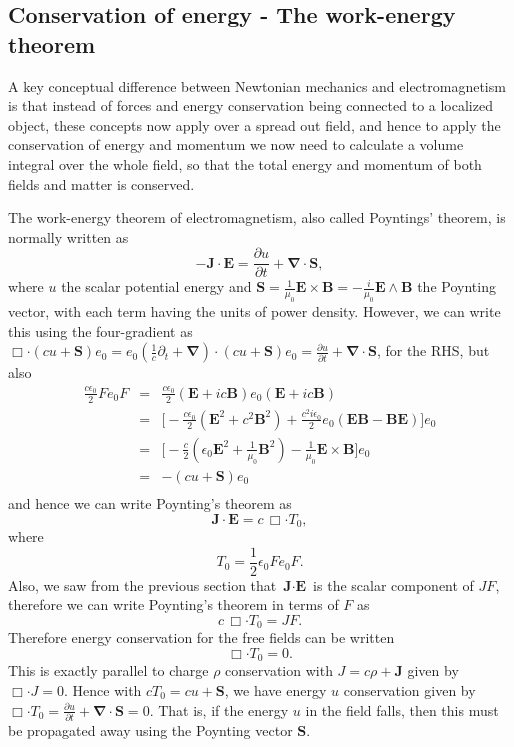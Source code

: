 \documentclass[12pt,aps,prb,preprint]{revtex4}   %
\newcommand{\be}{\begin{equation}}
\newcommand{\ee}{\end{equation}}
\newcommand{\bea}{\begin{eqnarray}}
\newcommand{\eea}{\end{eqnarray}}
\newcommand{\iGA}{{i}}
\begin{document}
\subsection{Conservation of energy - The work-energy theorem}

A key conceptual difference between Newtonian mechanics and electromagnetism is that instead of forces and energy conservation being connected to a localized object, these concepts now apply over a spread out field, and hence to apply the conservation of energy and momentum we now need to calculate a volume integral over the whole field, so that the total energy and momentum of both fields and matter is conserved.

The work-energy theorem of electromagnetism, also called Poyntings' theorem, is normally written \cite{Griffiths:1999} as
\be
- \mathbf{J} \cdot \mathbf{E} =   \frac{\partial u}{ \partial t}  +  \mathbf{\nabla} \cdot \mathbf{S} ,
\ee
where $ u $ the scalar potential energy and $ \mathbf{S} = \frac{1}{\mu_0}  \mathbf{E} \times \mathbf{B} = - \frac{\iGA}{\mu_0}  \mathbf{E} \wedge \mathbf{B}$ the Poynting vector, with each term having the units of power density.  However, we can write this using the four-gradient as $  \Box \cdot (c u + \mathbf{S}) e_0 = e_0 (\frac{1}{c} \partial_t + \mathbf{\nabla} ) \cdot (c u + \mathbf{S}) e_0  =   \frac{\partial u}{ \partial t}  +  \mathbf{\nabla} \cdot \mathbf{S} $, for the RHS, but also
\bea \label{FeoFExpansion}
\frac{c \epsilon_0}{2} F e_0 F & = & \frac{c \epsilon_0}{2} (\mathbf{E} + \iGA c \mathbf{B}) e_0 (\mathbf{E} + \iGA c \mathbf{B}) \\ \nonumber
& = & \big [- \frac{c \epsilon_0}{2} (\mathbf{E}^2 + c^2 \mathbf{B}^2 ) + \frac{c^2 \iGA \epsilon_0}{2} e_0 (\mathbf{E} \mathbf{B}-\mathbf{B} \mathbf{E} ) \big ]e_0 \\ \nonumber
& = & \big [- \frac{c }{2} ( \epsilon_0 \mathbf{E}^2 + \frac{1}{\mu_0} \mathbf{B}^2 ) - \frac{1}{\mu_0}  \mathbf{E} \times \mathbf{B} \big ] e_0  \\ \nonumber
& = & - ( c u +\mathbf{S}) e_0  \\ \nonumber
\eea
and hence we can write Poynting's theorem as
\be \label{workEnergyTheorem}
\mathbf{J} \cdot \mathbf{E}  =  c \, \Box \cdot T_0 ,
\ee
where
\be \label{StressEnergyTensorZero}
T_0 = \frac{1}{2} \epsilon_0 F e_0 F .
\ee
Also, we saw from the previous section that $ \textbf{J} \cdot \textbf{E} $ is the scalar component of $ J F $, therefore we can write Poynting's theorem in terms of $ F $ as
\be \label{workEnergyTheorem}
c \, \Box \cdot T_0 = J F .
\ee
Therefore energy conservation for the free fields can be written
\be \label{EnergyConservationFree}
\Box \cdot T_0 = 0 .
\ee
This is exactly parallel to charge $ \rho $ conservation with $ J = c \rho + \mathbf{J} $ given by $ \Box \cdot J = 0 $. Hence with $ c T_0 = c u + \textbf{S} $, we have energy $ u $ conservation given by $ \Box \cdot T_0 =  \frac{\partial u}{ \partial t}  +  \mathbf{\nabla} \cdot \mathbf{S} = 0 $. That is, if the energy $ u $ in the field falls, then this must be propagated away using the Poynting vector $ \mathbf{S} $.  
\end{document}
